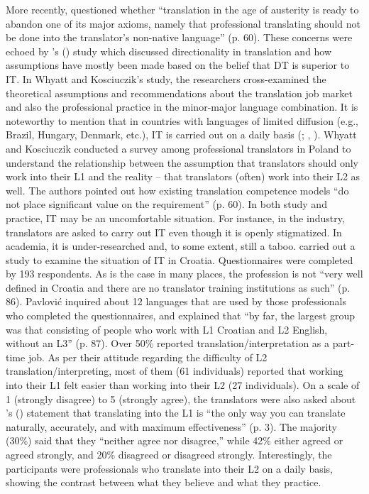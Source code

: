 \documentclass[output=paper]{langscibook}
\begin{document}
More recently, \citet{whyatt2013translation} questioned whether “translation in the age of austerity is ready to abandon one of its major axioms, namely that professional translating should not be done into the translator’s non-native language” (p. 60). These concerns were echoed by \citeauthor{ferreira2013direcionalidade}'s (\citeyear{ferreira2013direcionalidade}) study which discussed directionality in translation and how assumptions have mostly been made based on the belief that DT is superior to IT. In Whyatt and Kosciuczik’s study, the researchers cross-examined the theoretical assumptions and recommendations about the translation job market and also the professional practice in the minor-major language combination. It is noteworthy to mention that in countries with languages of limited diffusion (e.g., Brazil, Hungary, Denmark, etc.), IT is carried out on a daily basis (\citealt{ferreira2013direcionalidade}; \citealt{pokorn2004challenging}, \citeyear{pokorn2005challenging}). Whyatt and Kosciuczik conducted a survey among professional translators in Poland to understand the relationship between the assumption that translators should only work into their L1 and the reality -- that translators (often) work into their L2 as well. The authors pointed out how existing translation competence models “do not place significant value on the requirement” (p. 60). In both study and practice, IT may be an uncomfortable situation. For instance, in the industry, translators are asked to carry out IT even though it is openly stigmatized. In academia, it is under-researched and, to some extent, still a taboo. \citet{pavlovic2007directionality} carried out a study to examine the situation of IT in Croatia. Questionnaires were completed by 193 respondents. As is the case in many places, the profession is not “very well defined in Croatia and there are no translator training institutions as such” (p. 86). Pavlović inquired about 12 languages that are used by those professionals who completed the questionnaires, and explained that “by far, the largest group was that consisting of people who work with L1 Croatian and L2 English, without an L3” (p. 87). Over 50\% reported translation/interpretation as a part-time job. As per their attitude regarding the difficulty of L2 translation/interpreting, most of them (61 individuals) reported that working into their L1 felt easier than working into their L2 (27 individuals). On a scale of 1 (strongly disagree) to 5 (strongly agree), the translators were also asked about \citeauthor{newmark1988textbook}'s (\citeyear{newmark1988textbook}) statement that translating into the L1 is “the only way you can translate naturally, accurately, and with maximum effectiveness” (p. 3). The majority (30\%) said that they “neither agree nor disagree,” while 42\% either agreed or agreed strongly, and 20\% disagreed or disagreed strongly. Interestingly, the participants were professionals who translate into their L2 on a daily basis, showing the contrast between what they believe and what they practice.
\end{document}
